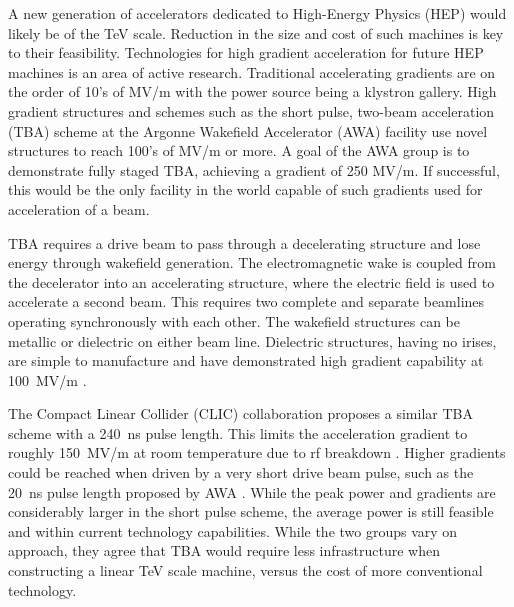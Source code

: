  \label{sec:motivation}

A new generation of accelerators dedicated to High-Energy Physics
(HEP) would likely be of the TeV scale. Reduction in the size and cost
of such machines is key to their feasibility. 
Technologies for high gradient acceleration for future HEP machines is an area of active research.
Traditional accelerating gradients are on the order of 10's of MV/m
with the power source being a klystron gallery.
High gradient structures and schemes such as the 
short pulse, two-beam acceleration (TBA) scheme 
at the Argonne Wakefield Accelerator (AWA) facility
use novel structures to reach 100's of MV/m or more. 
A goal of the AWA group is to demonstrate fully staged TBA, 
achieving a gradient of 250 MV/m. If successful, this would
be the only facility in the world capable of such gradients used for
acceleration of a beam.

TBA requires a drive beam to pass through a decelerating structure and
lose energy through wakefield generation. The electromagnetic wake
is coupled from the decelerator into an accelerating structure, where
the electric field is used to accelerate a second beam. 
This requires two complete and separate beamlines 
operating synchronously with each other.  
The wakefield structures can be metallic or dielectric on either beam line. 
Dielectric structures, having no irises, are simple to manufacture and have demonstrated
high gradient capability at \SI{100}{MV/m} \cite{WeiPaper}. 

The Compact Linear Collider (CLIC) collaboration proposes a similar TBA scheme with
a \SI{240}{ns} pulse length. This limits the acceleration gradient
to roughly \SI{150}{MV/m} at room temperature due to rf breakdown \cite{CLICdesignReport}.
Higher gradients could be reached when driven by a very short drive
beam pulse, such as the \SI{20}{ns} pulse length proposed by AWA \cite{WeiPaper}. 
While the peak power and gradients are considerably larger in the short pulse scheme, 
the average power is still feasible and within current technology capabilities.
While the two groups vary on approach, they agree that TBA would 
require less infrastructure when constructing a linear TeV scale machine, 
versus the cost of more conventional technology. 

